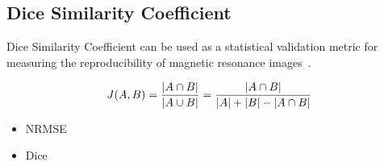 \subsection{Dice Similarity Coefficient}
Dice Similarity Coefficient can be used as a statistical validation metric for measuring the reproducibility of magnetic resonance images~\cite{Zou2004}. 
\begin{center}
  \begin{equation}
     J(A,B) = {{|A \cap B|}\over{|A \cup B|}} = {{|A \cap B|}\over{|A| + |B| - |A \cap B|}}
  \end{equation}
\end{center}
\begin{itemize}
\item NRMSE
\item Dice
\end{itemize}

